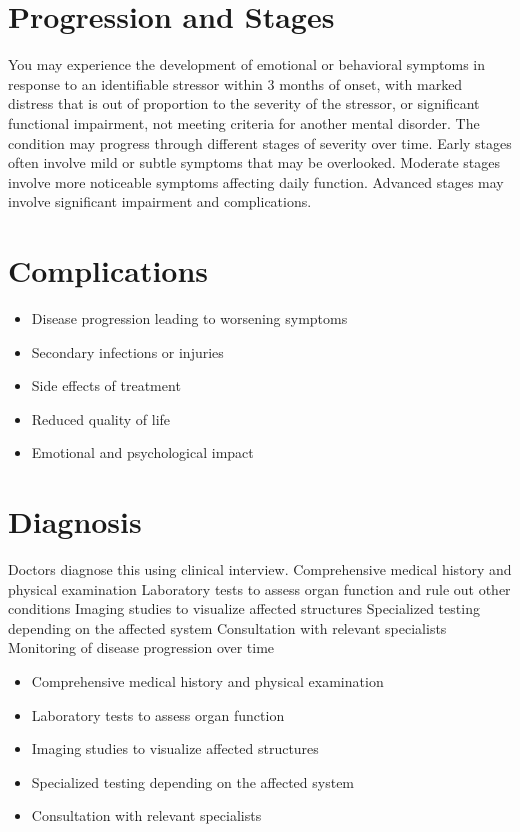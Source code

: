 \section{Progression and Stages}
You may experience the development of emotional or behavioral symptoms in response to an identifiable stressor within 3 months of onset, with marked distress that is out of proportion to the severity of the stressor, or significant functional impairment, not meeting criteria for another mental disorder. The condition may progress through different stages of severity over time. Early stages often involve mild or subtle symptoms that may be overlooked. Moderate stages involve more noticeable symptoms affecting daily function. Advanced stages may involve significant impairment and complications.
\section{Complications}
\begin{itemize}[noitemsep]
  \item Disease progression leading to worsening symptoms
  \item Secondary infections or injuries
  \item Side effects of treatment
  \item Reduced quality of life
  \item Emotional and psychological impact
\end{itemize}
\section{Diagnosis}
Doctors diagnose this using clinical interview. Comprehensive medical history and physical examination Laboratory tests to assess organ function and rule out other conditions Imaging studies to visualize affected structures Specialized testing depending on the affected system Consultation with relevant specialists Monitoring of disease progression over time

\begin{itemize}[noitemsep]
  \item Comprehensive medical history and physical examination
  \item Laboratory tests to assess organ function
  \item Imaging studies to visualize affected structures
  \item Specialized testing depending on the affected system
  \item Consultation with relevant specialists
\end{itemize}
